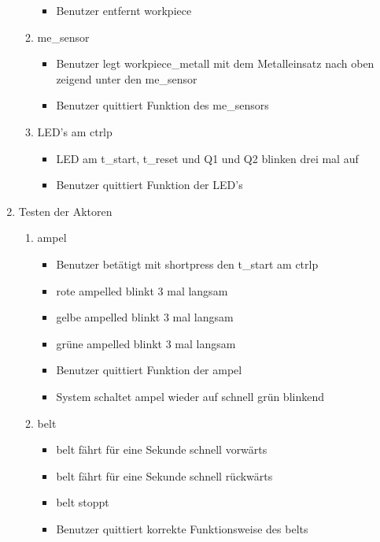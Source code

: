 \begin{enumerate}
\begin{enumerate}
\begin{itemize}
            \item Benutzer entfernt \gls{workpiece}
        \end{itemize}
        \item \Gls{me_sensor}
        \begin{itemize}
            \item Benutzer legt \gls{workpiece_metall} mit dem Metalleinsatz nach oben zeigend unter den \gls{me_sensor}
            \item Benutzer quittiert Funktion des \gls{me_sensor}s
        \end{itemize}
        \item LED's am \gls{ctrlp}
        \begin{itemize}
            \item LED am \gls{t_start}, \gls{t_reset} und Q1 und Q2 blinken drei mal auf
            \item Benutzer quittiert Funktion der LED's
        \end{itemize}
    \end{enumerate}
    \item Testen der Aktoren
    \begin{enumerate}
        \item \Gls{ampel}
        \begin{itemize}
            \item Benutzer betätigt mit \gls{shortpress} den \gls{t_start} am \gls{ctrlp}
            \item rote \gls{ampelled} blinkt 3 mal langsam
            \item gelbe \gls{ampelled} blinkt 3 mal langsam
            \item grüne \gls{ampelled} blinkt 3 mal langsam
            \item Benutzer quittiert Funktion der \gls{ampel}
            \item System schaltet \gls{ampel} wieder auf schnell grün blinkend
        \end{itemize}
        \item \Gls{belt}
        \begin{itemize}
            \item \Gls{belt} fährt für eine Sekunde schnell vorwärts
            \item \Gls{belt} fährt für eine Sekunde schnell rückwärts
            \item \Gls{belt} stoppt
            \item Benutzer quittiert korrekte Funktionsweise des \gls{belt}s

\end{itemize}
\end{enumerate}
\end{enumerate}
